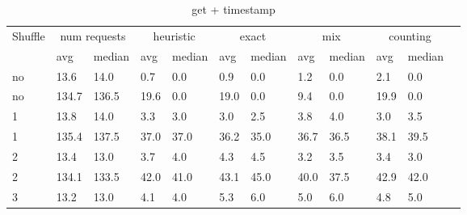 \documentclass[12pt,a4paper]{report}
\begin{document}
\begin{table}[h]
	\centering
	\caption{get + timestamp}
	\label{tab:get_ts}
	\begin{tabular}{|l|l|l|l|l|l|l|l|l|l|l|l|}
		\hline
		\multirow{2}{*}{Shuffle} & \multicolumn{2}{|c|}{num requests} & \multicolumn{2}{|c|}{heuristic} & \multicolumn{2}{|c|}{exact} & \multicolumn{2}{|c|}{mix} & \multicolumn{2}{|c|}{counting}                                          \\ \cline{2-11}
		                         & avg                                & median                          & avg                         & median                    & avg                            & median & avg  & median & avg  & median \\ \hline
		no                       & 13.6                               & 14.0                            & 0.7                         & 0.0                       & 0.9                            & 0.0    & 1.2  & 0.0    & 2.1  & 0.0    \\ \hline
		no                       & 134.7                              & 136.5                           & 19.6                        & 0.0                       & 19.0                           & 0.0    & 9.4  & 0.0    & 19.9 & 0.0    \\ \hline
		1                        & 13.8                               & 14.0                            & 3.3                         & 3.0                       & 3.0                            & 2.5    & 3.8  & 4.0    & 3.0  & 3.5    \\ \hline
		1                        & 135.4                              & 137.5                           & 37.0                        & 37.0                      & 36.2                           & 35.0   & 36.7 & 36.5   & 38.1 & 39.5   \\ \hline
		2                        & 13.4                               & 13.0                            & 3.7                         & 4.0                       & 4.3                            & 4.5    & 3.2  & 3.5    & 3.4  & 3.0    \\ \hline
		2                        & 134.1                              & 133.5                           & 42.0                        & 41.0                      & 43.1                           & 45.0   & 40.0 & 37.5   & 42.9 & 42.0   \\ \hline
		3                        & 13.2                               & 13.0                            & 4.1                         & 4.0                       & 5.3                            & 6.0    & 5.0  & 6.0    & 4.8  & 5.0    \\ \hline

\end{tabular}
\end{table}
\end{document}
